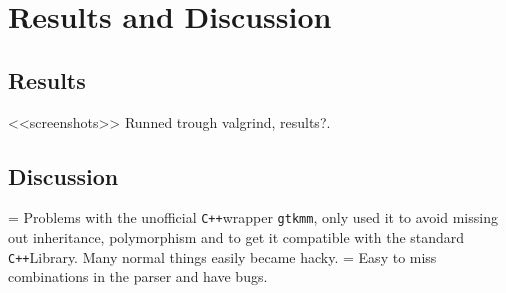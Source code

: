 \documentclass[a4paper,11pt]{kth-mag}
\newcommand{\Cpp}{\texttt{C++}}
\newcommand{\Gtkmm}{\texttt{gtkmm}}
\begin{document}
\chapter{Results and Discussion}

\section{Results}
<<screenshots>>
Runned trough valgrind, results?.

\section{Discussion}
 = Problems with the unofficial \Cpp wrapper \Gtkmm, only used it to avoid
 missing out inheritance, polymorphism and to get it compatible with the
 standard \Cpp Library. Many normal things easily became hacky. 
 = Easy to miss combinations in the parser and have bugs.
\end{document}
